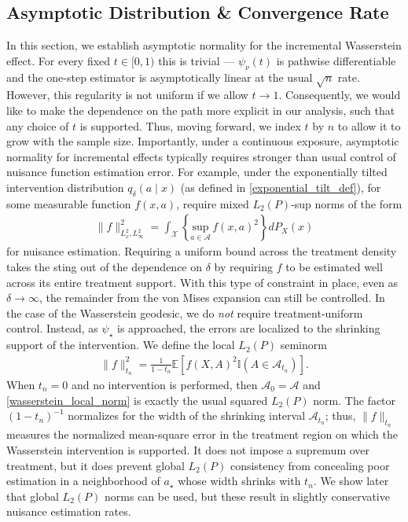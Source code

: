 \documentclass[11pt,twoside]{article}
\theoremstyle{definition}
\theoremstyle{remark}
\begin{document}
\subsection{Asymptotic Distribution \& Convergence Rate} \label{asymptotics_section}

In this section, we establish asymptotic normality for the incremental Wasserstein effect. For every fixed $t \in [0, 1)$ this is trivial --- $\psi_\nu(t)$ is pathwise differentiable and the one-step estimator is asymptotically linear at the usual $\sqrt{n}$ rate. However, this regularity is not uniform if we allow $t \to 1$. Consequently, we would like to make the dependence on the path more explicit in our analysis, such that any choice of $t$ is supported. Thus, moving forward, we index $t$ by $n$ to allow it to grow with the sample size. Importantly, under a continuous exposure, asymptotic normality for incremental effects typically requires stronger than usual control of nuisance function estimation error. For example, under the exponentially tilted intervention distribution $q_\delta(a \! \mid \! x)$ (as defined in \cref{exponential_tilt_def}), for some measurable function $f(x, a)$, \cite{schindl2024incremental} require mixed $L_2(P)$-sup norms of the form 
\begin{align*}
     \|f \|^2_{L^2_x, L^2_\infty} =  \int_{\mathcal{X}} \left\{\underset{a \in \mathcal{A}}{\text{sup}} \,  f(x, a)^2 \right\} dP_X(x)
\end{align*}
for nuisance estimation. Requiring a uniform bound across the treatment density takes the sting out of the dependence on $\delta$ by requiring $f$ to be estimated well across its entire treatment support. With this type of constraint in place, even as $\delta \to \infty$, the remainder from the von Mises expansion can still be controlled. In the case of the Wasserstein geodesic, we do \textit{not} require treatment-uniform control. Instead, as $\psi_\star$ is approached, the errors are localized to the shrinking support of the intervention. We define the local $L_2(P)$ seminorm
\begin{align} \label{wasserstein_local_norm}
    \|f\|^2_{t_n} =\frac{1}{1-t_n}\mathbb{E}[ f(X,A)^2\mathbb{I}(A\in\mathcal{A}_{t_n})].
\end{align}
When $t_n=0$ and no intervention is performed, then $\mathcal{A}_0=\mathcal{A}$ and \cref{wasserstein_local_norm} is exactly the usual squared $L_2(P)$ norm. The factor $(1-t_n)^{-1}$ normalizes for the width of the shrinking interval $\mathcal{A}_{t_n}$;
thus, $\|f\|_{t_n}$ measures the normalized mean-square error in the treatment region on which the Wasserstein intervention is supported. It does not impose a supremum over treatment, but it does prevent global $L_2(P)$ consistency from concealing poor estimation in a neighborhood of $a_\star$ whose width shrinks with $t_n$. We show later that global $L_2(P)$ norms can be used, but these result in slightly conservative nuisance estimation rates.
\end{document}

